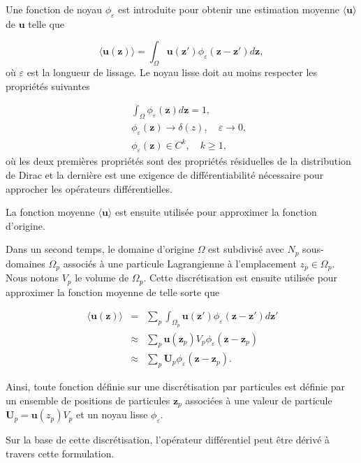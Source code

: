 Une fonction de noyau $\phi_\varepsilon$ est introduite pour obtenir une estimation moyenne $\langle \bm{u} \rangle$ de $\bm{u}$ telle que

\begin{equation*}
    \langle \bm{u}(\bm{z}) \rangle = \int_{\Omega} \bm{u}(\bm{z'}) \phi_\varepsilon(\bm{z}-\bm{z'}) d\bm{z},
\end{equation*}où $\varepsilon$ est la longueur de lissage. Le noyau lisse doit au moins respecter les propriétés suivantes

\begin{eqnarray*}
    && \int_{\Omega} \phi_\varepsilon(\bm{z}) d\bm{z} = 1,      \\
    && \phi_\varepsilon(\bm{z}) \to \delta(z), \quad \varepsilon \to 0, \\
    && \phi_\varepsilon(\bm{z}) \in C^k,  \quad k \geq 1,
\end{eqnarray*} où les deux premières propriétés sont des propriétés résiduelles de la distribution de Dirac et la dernière est une exigence de différentiabilité nécessaire pour approcher les opérateurs différentielles.

La fonction moyenne $\langle \bm{u} \rangle$ est ensuite utilisée pour approximer la fonction d'origine.

Dans un second temps, le domaine d'origine $\Omega$ est subdivisé avec $N_p$ sous-domaines $\Omega_p$ associés à une particule Lagrangienne à l'emplacement $z_p \in \Omega_p$. Nous notons $V_p$ le volume de $\Omega_p$. Cette discrétisation est ensuite utilisée pour approximer la fonction moyenne de telle sorte que

\begin{eqnarray*}~\label{part_approx}
    \langle \bm{u}(\bm{z}) \rangle &=& \sum_p \int_{\Omega_p} \bm{u}(\bm{z'}) \phi_\varepsilon(\bm{z}-\bm{z'}) d\bm{z'} \\
    &\approx& \sum_p \bm{u}(\bm{z}_p) V_p \phi_\varepsilon (\bm{z}-\bm{z}_p) \\
    &\approx& \sum_p \bm{U}_p \phi_\varepsilon (\bm{z}-\bm{z}_p).
\end{eqnarray*}

Ainsi, toute fonction définie sur une discrétisation par particules est définie par un ensemble de positions de particules $\bm{z}_p$ associées à une valeur de particule $\bm{U}_p = \bm{u}(z_p) V_p$ et un noyau lisse $\phi_\varepsilon$.

Sur la base de cette discrétisation, l'opérateur différentiel peut être dérivé à travers cette formulation.

